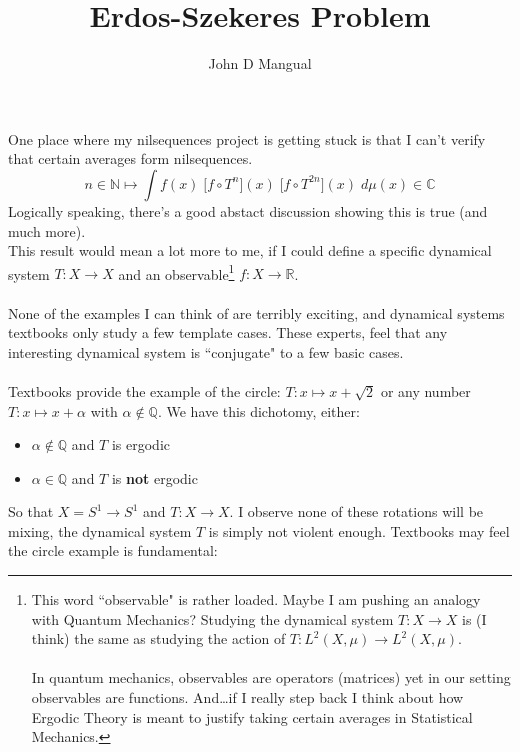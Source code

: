 \documentclass[12pt]{article}
\title{Erdos-Szekeres Problem}
\author{John D Mangual}
\date{}
\begin{document}
\selectfont \fontsize{12.5}{15}\selectfont

\maketitle

\noindent One place where my nilsequences project is getting stuck is that I can't verify that certain averages form nilsequences.  
$$ n  \in \mathbb{N} \mapsto \int f(x) \; \big[f \circ T^n \big](x) \; \big[f \circ T^{2n}\big](x) \; d\mu(x)  \in \mathbb{C} $$
Logically speaking, there's a good abstact discussion showing this is true (and much more).  \\ 
This result would mean a lot more to me, if I could define a specific dynamical system $T: X \to X$ and an observable\footnote{This word ``observable" is rather loaded.  Maybe I am pushing an analogy with Quantum Mechanics?  Studying the dynamical system $T: X \to X$ is (I think) the same as studying the action of $T: L^2(X,\mu) \to L^2(X,\mu) $. \\ \\ In quantum mechanics, observables are operators (matrices) yet in our setting observables are functions.  And\dots if I really step back I think about how Ergodic Theory is meant to justify taking certain averages in Statistical Mechanics.  } $f: X \to \mathbb{R}$. \\ \\ None of the examples I can think of are terribly exciting, and dynamical systems textbooks only study a few template cases.  These experts, feel that any interesting dynamical system is ``conjugate" to a few basic cases.  \\ \\
Textbooks provide the example of the circle: $T: x \mapsto x + \sqrt{2} $ or any number $T: x \mapsto x + \alpha$ with $\alpha \notin \mathbb{Q}$. We have this dichotomy, either:
\begin{itemize}
\item $\alpha \notin \mathbb{Q}$ and $T$ is ergodic
\item $\alpha \in \mathbb{Q} $ and $T$ is \textbf{not} ergodic
\end{itemize}
So that $X = S^1 \to S^1$ and $T: X \to X$. I observe none of these rotations will be mixing, the dynamical system $T$ is simply not violent enough.  Textbooks may feel the circle example is fundamental:
\end{document}
